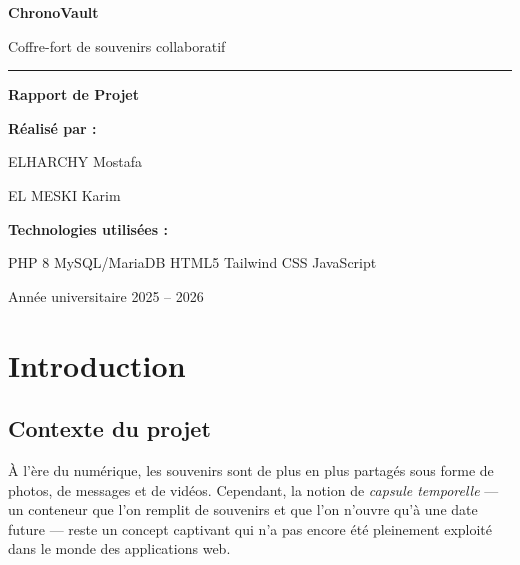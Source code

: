 \documentclass[12pt,a4paper]{report}
\begin{document}
\begin{titlepage}
    \centering
    \vspace*{2cm}

    {\Huge\bfseries\textcolor{cvdark}{ChronoVault}\par}
    \vspace{0.5cm}
    {\Large\textcolor{cvgreen}{Coffre-fort de souvenirs collaboratif}\par}
    \vspace{1cm}

    \rule{0.6\textwidth}{1pt}\par
    \vspace{1.5cm}

    {\large\textbf{Rapport de Projet}\par}
    \vspace{2cm}

    {\large
        \textbf{Réalisé par :}\par
        \vspace{0.5cm}
        ELHARCHY Mostafa \par
        EL MESKI Karim \par
    }

    \vspace{2cm}

    {\large
        \textbf{Technologies utilisées :}\par
        \vspace{0.3cm}
        PHP 8 \textbullet{} MySQL/MariaDB \textbullet{} HTML5 \textbullet{} Tailwind CSS \textbullet{} JavaScript\par
    }

    \vfill
    {\large Année universitaire 2025 -- 2026\par}
\end{titlepage}

\tableofcontents
\newpage

\chapter{Introduction}

\section{Contexte du projet}

À l'ère du numérique, les souvenirs sont de plus en plus partagés sous forme de photos, de messages et de vidéos. Cependant, la notion de \textit{capsule temporelle} --- un conteneur que l'on remplit de souvenirs et que l'on n'ouvre qu'à une date future --- reste un concept captivant qui n'a pas encore été pleinement exploité dans le monde des applications web.
\end{document}
